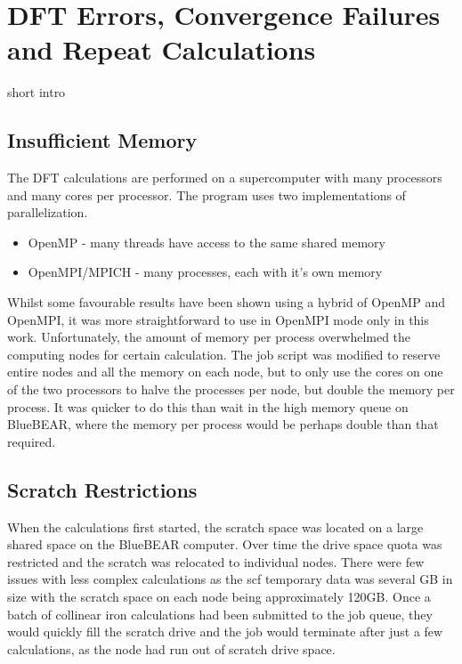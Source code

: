 

\section[Issues to Overcome]{DFT Errors, Convergence Failures and Repeat Calculations}

short intro

\subsection{Insufficient Memory}

The DFT calculations are performed on a supercomputer with many processors and many cores per processor.  The program uses two implementations of parallelization.

\begin{itemize}
\item OpenMP - many threads have access to the same shared memory
\item OpenMPI/MPICH - many processes, each with it's own memory
\end{itemize}

Whilst some favourable results have been shown using a hybrid of OpenMP and OpenMPI, it was more straightforward to use in OpenMPI mode only in this work.  Unfortunately, the amount of memory per process overwhelmed the computing nodes for certain calculation.  The job script was modified to reserve entire nodes and all the memory on each node, but to only use the cores on one of the two processors to halve the processes per node, but double the memory per process.  It was quicker to do this than wait in the high memory queue on BlueBEAR, where the memory per process would be perhaps double than that required.

\subsection{Scratch Restrictions}

When the calculations first started, the scratch space was located on a large shared space on the BlueBEAR computer.  Over time the drive space quota was restricted and the scratch was relocated to individual nodes.  There were few issues with less complex calculations as the \acrshort{scf} temporary data was several GB in size with the scratch space on each node being approximately 120GB.  Once a batch of collinear iron calculations had been submitted to the job queue, they would quickly fill the scratch drive and the job would terminate after just a few calculations, as the node had run out of scratch drive space.

